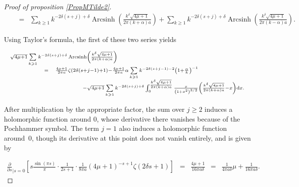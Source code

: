 \documentclass{jams-l}
\theoremstyle{definition}
\theoremstyle{remark}
\numberwithin{equation}{section}
\DeclareMathOperator{\arcsinh}{Arcsinh}
\begin{document}
\begin{proof}[Proof of proposition \ref{PropMTilde2}]
\begin{equation}
{\begin{array}{lll}
                            \quad & \scriptstyle = & \scriptstyle \sum\limits_{k \geqslant 1}  k^{- 2 \delta \left( s + j \right) + \delta} \arcsinh \left( \frac{k^{\delta} \sqrt{4 \mu + 1}}{2 \pi \left( k + \alpha \right) a} \right) + \sum\limits_{k \geqslant 1}  k^{- 2 \delta \left( s + j \right) + \delta} \arcsinh \left( \frac{k^{\delta} \sqrt{4 \mu + 1}}{2 \pi \left( k - \alpha \right) a} \right).
                        \end{array}}
                    \end{equation}
                    
                    \noindent Using Taylor's formula, the first of these two series yields
                    
                    \[ \begin{array}{lll}
                            \multicolumn{3}{l}{\scriptstyle \sqrt{4 \mu + 1} \sum\limits_{k \geqslant 1}  k^{- 2 \delta \left( s + j \right) + \delta} \arcsinh \left( \frac{k^{\delta} \sqrt{4 \mu + 1}}{2 \pi \left( k + \alpha \right) a} \right)} \\[0.5em]
                            
                            \qquad \qquad & \scriptstyle = & \scriptstyle \frac{4 \mu + 1}{2 \pi a} \zeta \left( 2 \delta \left( s + j - 1 \right) + 1 \right) - \frac{4 \mu + 1}{2 \pi a} \alpha \sum\limits_{k \geqslant 1} k^{- 2 \delta \left( s + j - 1 \right) - 2} \left( 1 + \frac{\alpha}{k} \right)^{-1} \\[0.5em]
                            
                            && \scriptstyle \qquad \qquad - \sqrt{4 \mu + 1} \sum\limits_{k \geqslant 1} k^{- 2 \delta \left( s + j \right) + \delta} \int_0^{\frac{k^{\delta} \sqrt{4 \mu + 1}}{2 \pi \left( k + \alpha \right) a}} \frac{x}{\left( 1 + x^2 \right)^{3/2}} \left( \frac{k^{\delta} \sqrt{4 \mu + 1}}{2 \pi \left( k + \alpha \right) a} - x \right) \mathrm{d}x.
                        \end{array} \]
                    
                    \noindent After multiplication by the appropriate factor, the sum over $j \geqslant 2$ induces a holomorphic function around $0$, whose derivative there vanishes because of the Pochhammer symbol. The term $j=1$ also induces a holomorphic function around~$0$, though its derivative at this point does not vanish entirely, and is given by
                    
                    \[ \begin{array}{lllll}
                            \scriptstyle \frac{\partial}{\partial s}_{\left \vert s = 0 \right.} \left[ s \frac{\sin \left( \pi s \right)}{\pi} \cdot \frac{1}{2s + 1} \cdot \frac{1}{8 \pi a} \left( 4 \mu + 1 \right)^{-s+1} \zeta \left( 2 \delta s + 1 \right) \right] & \scriptstyle = & \scriptstyle \frac{4 \mu + 1}{16 \pi a \delta} & \scriptstyle = & \scriptstyle \frac{1}{4 \pi a \delta} \mu + \frac{1}{16 \pi a \delta}.
                        \end{array} \]
                    

\end{proof}
\end{document}
